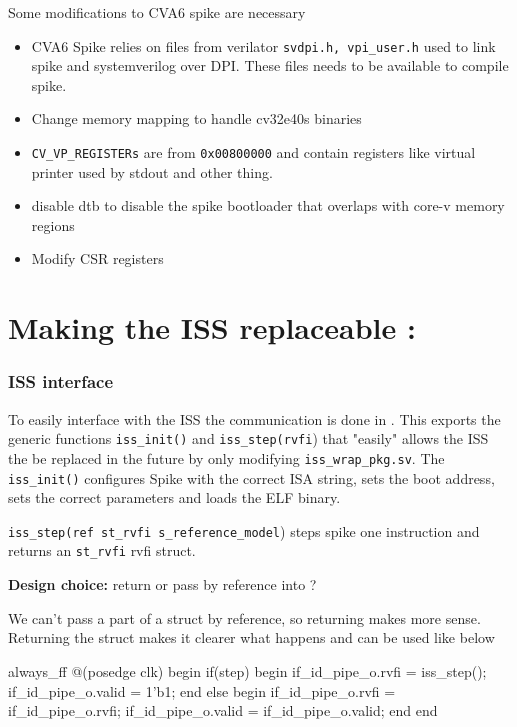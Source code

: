 Some modifications to CVA6 spike are necessary
\begin{itemize}
    \item CVA6 Spike relies on files from verilator \lstinline{svdpi.h, vpi_user.h} used to link spike and systemverilog over DPI. These files needs to be available to compile spike.
    \item Change memory mapping to handle cv32e40s binaries 
    \item \lstinline{CV_VP_REGISTERs} are from \lstinline{0x00800000} and contain registers like virtual printer used by stdout and other thing.
    \item  disable dtb to disable the spike bootloader that overlaps with core-v memory regions
    \item Modify CSR registers
\end{itemize}




\section{Making the ISS replaceable :  }

\subsubsection{ISS interface}

To easily interface with the ISS the communication is done in . This exports the generic functions \lstinline{iss_init()} and \lstinline{iss_step(rvfi}) that "easily" allows the ISS the be replaced in the future by only modifying \lstinline{iss_wrap_pkg.sv}. The \lstinline{iss_init()} configures Spike with the correct ISA string, sets the boot address, sets the correct parameters and loads the ELF binary. 

\lstinline{iss_step(ref st_rvfi s_reference_model}) steps spike one instruction and returns an \lstinline{st_rvfi} rvfi struct.

\textbf{Design choice:} return  or pass by reference into ?

We can't pass a part of a struct by reference, so returning makes more sense.
Returning the struct makes it clearer what happens and can be used like below

\begin{systemverilog}
always_ff @(posedge clk) begin
    if(step) begin
        if_id_pipe_o.rvfi = iss_step();
        if_id_pipe_o.valid = 1'b1;
    end
    else begin
        if_id_pipe_o.rvfi = if_id_pipe_o.rvfi;
        if_id_pipe_o.valid = if_id_pipe_o.valid;
    end
end

\end{systemverilog}

